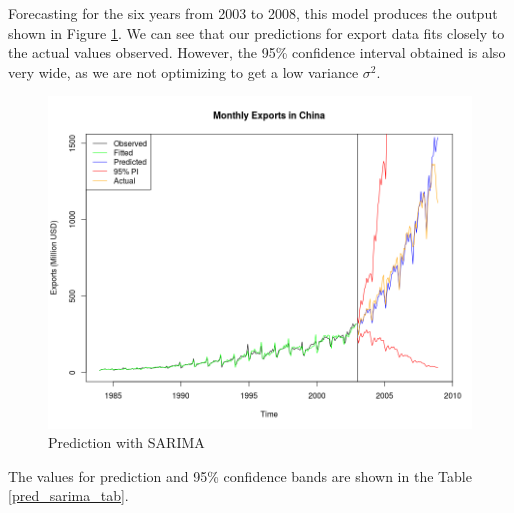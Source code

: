\documentclass[]{article}
\begin{document}
Forecasting for the six years from 2003 to 2008, this model produces the output shown in Figure \ref{pred_sarima}. We can see that our predictions for export data fits closely to the actual values observed. However, the 95\% confidence interval obtained is also very wide, as we are not optimizing to get a low variance $\sigma^2$. 

\begin{figure}[!ht]
\centering
\includegraphics[width=.8\textwidth]{pred_sarima}
\caption{Prediction with SARIMA}
\label{pred_sarima}
\end{figure}

The values for prediction and 95\% confidence bands are shown in the Table \ref{pred_sarima_tab}.

\begin{table}[!ht]
\centering
{}
\caption{2003 forecast and 95\% confidence interval bands for SARIMA}
\label{pred_sarima_tab}
\end{table}
\end{document}
